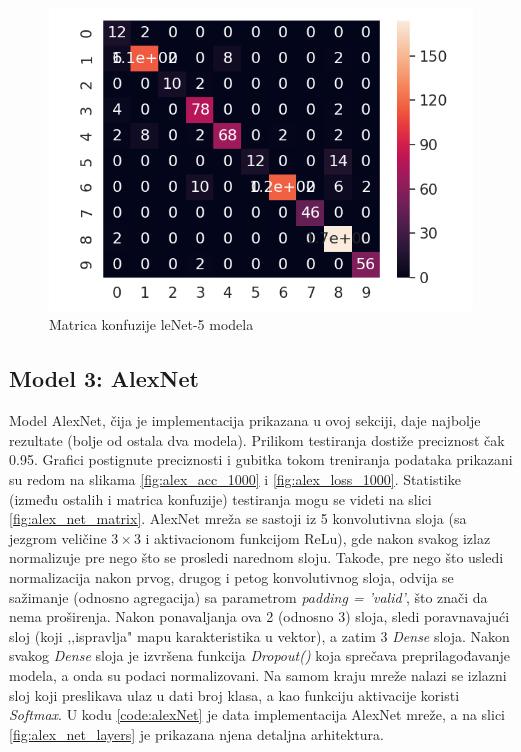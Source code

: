 \documentclass[a4paper]{article}
\begin{document}
\begin{figure}[h!]
\begin{center}
\includegraphics[scale=0.6]{confussion_matrix_1.png}
\end{center}
\caption{Matrica konfuzije leNet-5 modela}
\label{fig:confussion_matrix_1}
\end{figure}


\subsection{Model 3: AlexNet}
\label{sec:model_3}
Model AlexNet, čija je implementacija prikazana u ovoj sekciji, daje najbolje rezultate (bolje od ostala dva modela). Prilikom testiranja dostiže preciznost čak 0.95. Grafici postignute preciznosti i gubitka tokom treniranja podataka prikazani su redom na slikama \ref{fig:alex_acc_1000} i \ref{fig:alex_loss_1000}. Statistike (između ostalih i matrica konfuzije) testiranja mogu se videti na slici \ref{fig:alex_net_matrix}.
AlexNet mreža se sastoji iz 5 konvolutivna sloja (sa jezgrom veličine $3\times3$ i aktivacionom funkcijom ReLu), gde nakon svakog izlaz normalizuje pre nego što se prosledi narednom sloju. Takođe, pre nego što usledi normalizacija nakon prvog, drugog i petog konvolutivnog sloja, odvija se sažimanje (odnosno agregacija) sa parametrom \textit{padding = 'valid'}, što znači da nema proširenja. Nakon ponavaljanja ova 2 (odnosno 3) sloja, sledi poravnavajući sloj (koji ‚‚ispravlja" mapu karakteristika u vektor), a zatim 3 \textit{Dense} sloja. Nakon svakog \textit{Dense} sloja je izvršena funkcija \textit{Dropout()} koja sprečava preprilagođavanje modela, a onda su podaci normalizovani. Na samom kraju mreže nalazi se izlazni sloj koji preslikava ulaz u dati broj klasa, a kao funkciju aktivacije koristi \textit{Softmax}. U kodu \ref{code:alexNet} je data implementacija AlexNet mreže, a na slici \ref{fig:alex_net_layers} je prikazana njena detaljna arhitektura.
\end{document}
